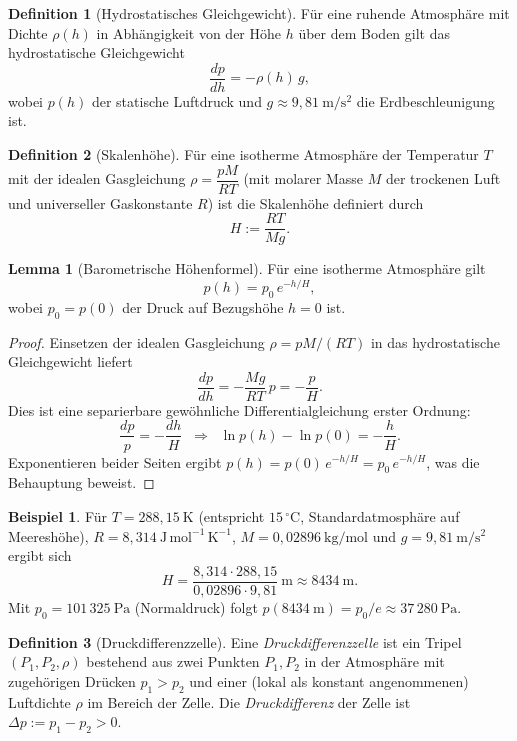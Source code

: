 ﻿\documentclass[a4paper,12pt]{article}
\theoremstyle{definition}
\newtheorem{definition}{Definition}
\newtheorem{beispiel}{Beispiel}
\newtheorem{lemma}{Lemma}
\begin{document}
\begin{definition}[Hydrostatisches Gleichgewicht]
	Für eine ruhende Atmosphäre mit Dichte $\rho(h)$ in Abhängigkeit von
	der Höhe $h$ über dem Boden gilt das hydrostatische Gleichgewicht
	\[
		\frac{dp}{dh} = -\rho(h)\, g,
	\]
	wobei $p(h)$ der statische Luftdruck und $g \approx 9{,}81\ \mathrm{m/s^2}$
	die Erdbeschleunigung ist.
\end{definition}

\begin{definition}[Skalenhöhe]
	Für eine isotherme Atmosphäre der Temperatur $T$ mit der idealen
	Gasgleichung $\rho = \dfrac{pM}{RT}$ (mit molarer Masse $M$ der
	trockenen Luft und universeller Gaskonstante $R$) ist die Skalenhöhe
	definiert durch
	\[
		H := \frac{RT}{Mg}.
	\]
\end{definition}

\begin{lemma}[Barometrische Höhenformel]
	\label{lem:barometrisch}
	Für eine isotherme Atmosphäre gilt
	\[
		p(h) = p_0 \, e^{-h/H},
	\]
	wobei $p_0 = p(0)$ der Druck auf Bezugshöhe $h=0$ ist.
\end{lemma}

\begin{proof}
	Einsetzen der idealen Gasgleichung $\rho = pM/(RT)$ in das
	hydrostatische Gleichgewicht liefert
	\[
		\frac{dp}{dh} = -\frac{Mg}{RT}\, p = -\frac{p}{H}.
	\]
	Dies ist eine separierbare gewöhnliche Differentialgleichung erster
	Ordnung:
	\[
		\frac{dp}{p} = -\frac{dh}{H}
		\;\;\Longrightarrow\;\;
		\ln p(h) - \ln p(0) = -\frac{h}{H}.
	\]
	Exponentieren beider Seiten ergibt $p(h) = p(0)\, e^{-h/H} = p_0\,
	e^{-h/H}$, was die Behauptung beweist.
\end{proof}

\begin{beispiel}
	\label{bsp:skalenhoehe}
	Für $T = 288{,}15\ \mathrm{K}$ (entspricht $15\,^\circ\mathrm{C}$,
	Standardatmosphäre auf Meereshöhe), $R = 8{,}314\
	\mathrm{J\,mol^{-1}\,K^{-1}}$, $M = 0{,}02896\ \mathrm{kg/mol}$ und
	$g = 9{,}81\ \mathrm{m/s^2}$ ergibt sich
	\[
		H = \frac{8{,}314 \cdot 288{,}15}{0{,}02896 \cdot 9{,}81}\
		\mathrm{m} \approx 8434\ \mathrm{m}.
	\]
	Mit $p_0 = 101\,325\ \mathrm{Pa}$ (Normaldruck) folgt
	$p(8434\ \mathrm{m}) = p_0/e \approx 37\,280\ \mathrm{Pa}$.
\end{beispiel}

\begin{definition}[Druckdifferenzzelle]
	\label{def:zelle}
	Eine \emph{Druckdifferenzzelle} ist ein Tripel
	$(P_1, P_2, \rho)$ bestehend aus zwei Punkten $P_1, P_2$ in der
	Atmosphäre mit zugehörigen Drücken $p_1 > p_2$ und einer (lokal als
	konstant angenommenen) Luftdichte $\rho$ im Bereich der Zelle. Die
	\emph{Druckdifferenz} der Zelle ist $\Delta p := p_1 - p_2 > 0$.
\end{definition}
\end{document}
